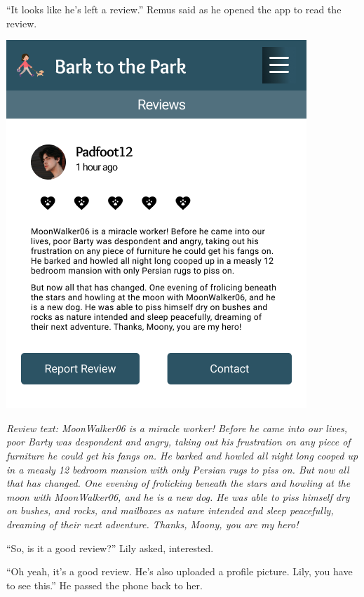 \documentclass[12pt,twoside,openright]{memoir}
\begin{document}
``It looks like he's left a review.'' Remus said as he opened the app to read the review.

\bigskip

{\hfill\includegraphics[height=\textheight]{Review RegularFont}\hfill}
 

\textit{Review text: MoonWalker06 is a miracle worker! Before he came into our lives, poor Barty was despondent and angry, taking out his frustration on any piece of furniture he could get his fangs on. He barked and howled all night long cooped up in a measly 12 bedroom mansion with only Persian rugs to piss on. But now all that has changed. One evening of frolicking beneath the stars and howling at the moon with MoonWalker06, and he is a new dog. He was able to piss himself dry on bushes, and rocks, and mailboxes as nature intended and sleep peacefully, dreaming of their next adventure. Thanks, Moony, you are my hero! }

``So, is it a good review?'' Lily asked, interested.

``Oh yeah, it's a good review. He's also uploaded a profile picture. Lily, you have to see this.'' He passed the phone back to her.
\end{document}
